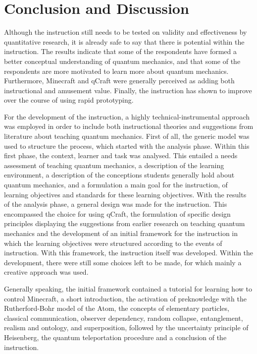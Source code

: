 \documentclass[11pt,twoside]{report} %
\begin{document}
\chapter{Conclusion and Discussion}

Although the instruction still needs to be tested on validity and effectiveness by quantitative research, it is already safe to say that there is potential within the instruction. The results indicate that some of the respondents have formed a better conceptual understanding of quantum mechanics, and that some of the respondents are more motivated to learn more about quantum mechanics. Furthermore, Minecraft and qCraft were generally perceived as adding both instructional and amusement value. Finally, the instruction has shown to improve over the course of using rapid prototyping.

For the development of the instruction, a highly technical-instrumental approach was employed in order to include both instructional theories and suggestions from literature about teaching quantum mechanics. First of all, the generic model was used to structure the process, which started with the analysis phase. Within this first phase, the context, learner and task was analysed. This entailed a needs assessment of teaching quantum mechanics, a description of the learning environment, a description of the conceptions students generally hold about quantum mechanics, and a formulation a main goal for the instruction, of learning objectives and standards for these learning objectives. With the results of the analysis phase, a general design was made for the instruction. This encompassed the choice for using qCraft, the formulation of specific design principles displaying the suggestions from earlier research on teaching quantum mechanics and the development of an initial framework for the instruction in which the learning objectives were structured according to the events of instruction. With this framework, the instruction itself was developed. Within the development, there were still some choices left to be made, for which mainly a creative approach was used.

Generally speaking, the initial framework contained a tutorial for learning how to control Minecraft, a short introduction, the activation of preknowledge with the Rutherford-Bohr model of the Atom, the concepts of elementary particles, classical communication, observer dependency, random collapse, entanglement, realism and ontology, and superposition, followed by the uncertainty principle of Heisenberg, the quantum teleportation procedure and a conclusion of the instruction.
\end{document}
